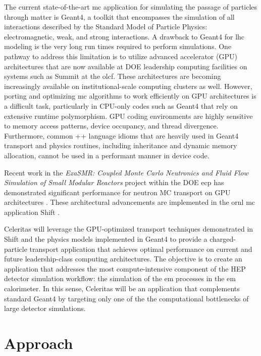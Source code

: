 \documentclass[10pt]{article}
\begin{document}
The current state-of-the-art \ac{mc} application for simulating
the passage of particles through matter is Geant4, a toolkit
that encompasses the simulation of all interactions described by the Standard
Model of Particle Physics: electromagnetic, weak, and strong
interactions. A drawback to Geant4 for \ac{lhc} modeling is the very long run
times required to perform simulations. One pathway to address this
limitation is to utilize advanced accelerator (GPU) architectures that
are now available at DOE leadership computing facilities on systems such
as Summit at the \ac{olcf}. These architectures are becoming increasingly
available on institutional-scale computing clusters as well. However,
porting and optimizing \ac{mc} algorithms to work efficiently on GPU
architectures is a difficult task, particularly in CPU-only codes such
as Geant4 that rely on extensive runtime polymorphism. GPU coding
environments are highly sensitive to memory access patterns, device
occupancy, and thread divergence. Furthermore, common \C++ language
idioms that are heavily used in Geant4 transport and physics routines,
including inheritance and dynamic memory allocation, cannot be used in a
performant manner in device code.

Recent work in the \emph{ExaSMR: Coupled Monte Carlo Neutronics and
Fluid Flow Simulation of Small Modular Reactors} project within the DOE
\ac{ecp} \cite{ecp2019} has
demonstrated significant performance for neutron MC transport on GPU
architectures \cite{hamilton_continuous-energy_2019}. These architectural
advancements are implemented in the \ac{ornl} \ac{mc} application Shift 
\cite{pandya_implementation_2016}. 

Celeritas will leverage the GPU-optimized transport techniques demonstrated
in Shift and the physics models implemented in Geant4
to provide a charged-particle
transport application that achieves optimal performance on current and
future leadership-class computing architectures. The objective is to
create an application that addresses the most compute-intensive
component of the HEP detector simulation workflow: the simulation of the \ac{em} processes in the \ac{em} calorimeter.
In this sense, Celeritas will be an application that complements standard
Geant4 by targeting only one of the the computational bottlenecks of large detector simulations.

\section*{Approach}
\end{document}
